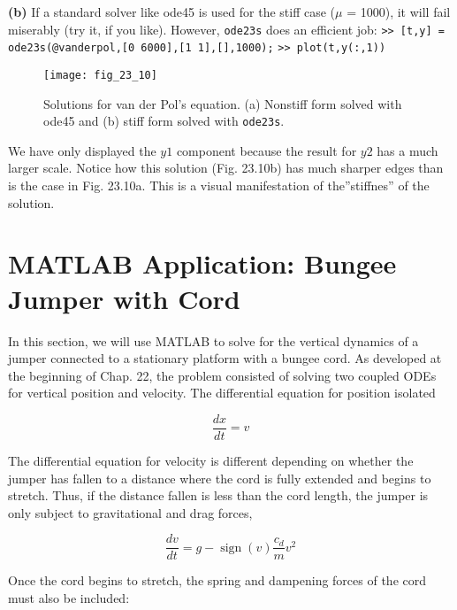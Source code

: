 \documentclass[../main.tex]{subfiles}
\begin{document}
\begin{exmp}
    \noindent \textbf{(b)} If a standard solver like ode45 is used for the stiff case ($\mu$ = 1000), it will fail miserably (try it, if you like). However, \texttt{ode23s} does an efficient job:
    \noindent \texttt{>> [t,y] = ode23s(@vanderpol,[0 6000],[1 1],[],1000);}
    \noindent \texttt{>> plot(t,y(:,1))}

    \begin{figure}[H]
        \centering
        \texttt{[image: fig\_23\_10]}
       \caption{\textsf{Solutions for van der Pol's equation. (a) Nonstiff form solved with ode45 and (b) stiff form solved with \texttt{ode23s}.}}\label{fig:fig_23_10}
    \end{figure}

    We have only displayed the $y1$ component because the result for $y2$ has a much larger scale.
    Notice how this solution (Fig. 23.10b) has much sharper edges than is the case in Fig. 23.10a.
    This is a visual manifestation of the''stiffnes'' of the solution.
\end{exmp}
\vspace{10mm}


\section{MATLAB Application: Bungee Jumper with Cord}
\noindent In this section, we will use MATLAB to solve for the vertical dynamics of a jumper connected to a stationary platform with a bungee cord. As developed at the beginning of Chap. 22, the problem consisted of solving two coupled ODEs for vertical position and
velocity. The differential equation for position isolated

\begin{equation}
    \tag{23.26}
    \frac{dx}{dt} = v
\end{equation}

\noindent The differential equation for velocity is different depending on whether the jumper has fallen to a distance where the cord is fully extended and begins to stretch. Thus, if the distance
fallen is less than the cord length, the jumper is only subject to gravitational and drag forces,

\begin{equation}
    \tag{23.27a}
    \frac{d v}{d t}=g-\operatorname{sign}(v) \frac{c_{d}}{m} v^{2}
\end{equation}

\noindent Once the cord begins to stretch, the spring and dampening forces of the cord must also be included:
\end{document}

